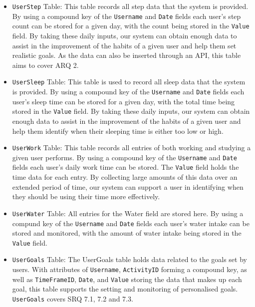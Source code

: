 \documentclass[11pt]{article}
\begin{document}
\begin{itemize}

    \item \texttt{UserStep} Table: This table records all step data
    that the system is provided. By using a compound key
    of the \texttt{Username} and \texttt{Date} fields each user's step count can be stored
    for a given day, with the count being stored in the \texttt{Value} field. By taking these 
    daily inputs, our system can obtain enough data to assist in the improvement of the
    habits of a given user and help them set realistic goals. As the data can also be inserted 
    through an API, this table aims to cover ARQ 2.\par

    \item \texttt{UserSleep} Table: This table is used to record all sleep data 
    that the system is provided. By using a compound key
    of the \texttt{Username} and \texttt{Date} fields each user's sleep time can be stored
    for a given day, with the total time being stored in the \texttt{Value} field. By taking these 
    daily inputs, our system can obtain enough data to assist in the improvement of the
    habits of a given user and help them identify when their sleeping time is either too low or high.\par

    \item \texttt{UserWork} Table: This table records all entries of both working and studying
    a given user performs. By using a compound key of
    the \texttt{Username} and \texttt{Date} fields each user's daily work time can be stored. The \texttt{Value} field holds the time data for each entry.
    By collecting large amounts of this data over an extended period of time, our system can support a user in identifying
    when they should be using their time more effectively.\par

    \item \texttt{UserWater} Table: All entries for the Water field are stored here.
    By using a compund key of the \texttt{Username} and \texttt{Date} fields each user's water 
    intake can be stored and monitored, with the amount of water intake being stored in the \texttt{Value} field.\par

    \newpage

    \item \texttt{UserGoals} Table: The UserGoals table holds data related to the goals set by users.
        With attributes of \texttt{Username}, \texttt{ActivityID} forming a compound key, as well as \texttt{TimeFrameID}, \texttt{Date}, and
        \texttt{Value} storing the data that makes up each goal, this table supports the setting and monitoring of personalised
        goals. \texttt{UserGoals} covers SRQ 7.1, 7.2 and 7.3.\par

\end{itemize}
\end{document}
